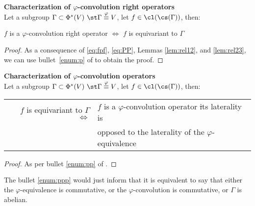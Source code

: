 \begin{theorem}\textbf{Characterization of $\varphi$-convolution right operators}\\
Let a subgroup $\Gamma \subset \Phi^*(V)~\st \Gamma \overset{\varphi}{\equiv} V$, let $f \in \cl(\cs(\Gamma))$, then:\\
\centerline{$f$ is a $\varphi$-convolution right operator $\Leftrightarrow$ $f$ is equivariant to $\Gamma$}
\label{prop:equiG}
\end{theorem}
\begin{proof}
As a consequence of \eqref{eq:fpf}, \eqref{eq:PP}, Lemmas \ref{lem:rel12}, and \ref{lem:rel23}, we can use bullet~\ref{enum:p} of  to obtain the proof.
\end{proof}

\begin{corollary}\textbf{Characterization of $\varphi$-convolution operators}\\
Let a subgroup $\Gamma \subset \Phi^*(V)~\st \Gamma \overset{\varphi}{\equiv} V$, let $f \in \cl(\cs(\Gamma))$, then:\\
\begin{tabular}{rl}
  $f$ is equivariant to $\Gamma$ $\Leftrightarrow$ &
  $f$ is a $\varphi$-convolution operator \st its laterality is \\
  & opposed to the laterality of the $\varphi$-equivalence
\end{tabular}
\label{cor:equiG}
\end{corollary}
\begin{proof}
As per bullet \ref{enum:pp} of .
\end{proof}

\begin{remark}
The bullet \ref{enum:ppp} would just inform that it is equivalent to say that either the $\varphi$-equivalence is commutative, or the $\varphi$-convolution is commutative, or $\Gamma$ is abelian.
\end{remark}


